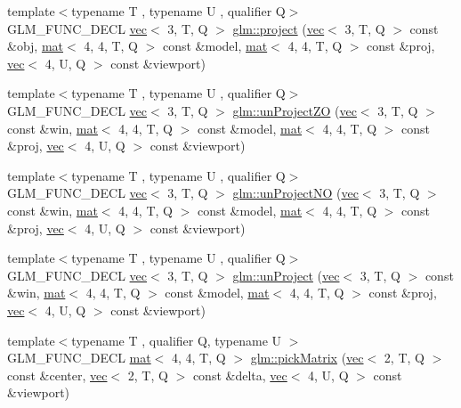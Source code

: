 \begin{DoxyCompactItemize}
\item 
{\footnotesize template$<$typename T , typename U , qualifier Q$>$ }\\G\+L\+M\+\_\+\+F\+U\+N\+C\+\_\+\+D\+E\+CL \hyperlink{structglm_1_1vec}{vec}$<$ 3, T, Q $>$ \hyperlink{group__gtc__matrix__transform_gaf36e96033f456659e6705472a06b6e11}{glm\+::project} (\hyperlink{structglm_1_1vec}{vec}$<$ 3, T, Q $>$ const \&obj, \hyperlink{structglm_1_1mat}{mat}$<$ 4, 4, T, Q $>$ const \&model, \hyperlink{structglm_1_1mat}{mat}$<$ 4, 4, T, Q $>$ const \&proj, \hyperlink{structglm_1_1vec}{vec}$<$ 4, U, Q $>$ const \&viewport)
\item 
{\footnotesize template$<$typename T , typename U , qualifier Q$>$ }\\G\+L\+M\+\_\+\+F\+U\+N\+C\+\_\+\+D\+E\+CL \hyperlink{structglm_1_1vec}{vec}$<$ 3, T, Q $>$ \hyperlink{group__gtc__matrix__transform_gade5136413ce530f8e606124d570fba32}{glm\+::un\+Project\+ZO} (\hyperlink{structglm_1_1vec}{vec}$<$ 3, T, Q $>$ const \&win, \hyperlink{structglm_1_1mat}{mat}$<$ 4, 4, T, Q $>$ const \&model, \hyperlink{structglm_1_1mat}{mat}$<$ 4, 4, T, Q $>$ const \&proj, \hyperlink{structglm_1_1vec}{vec}$<$ 4, U, Q $>$ const \&viewport)
\item 
{\footnotesize template$<$typename T , typename U , qualifier Q$>$ }\\G\+L\+M\+\_\+\+F\+U\+N\+C\+\_\+\+D\+E\+CL \hyperlink{structglm_1_1vec}{vec}$<$ 3, T, Q $>$ \hyperlink{group__gtc__matrix__transform_gae089ba9fc150ff69c252a20e508857b5}{glm\+::un\+Project\+NO} (\hyperlink{structglm_1_1vec}{vec}$<$ 3, T, Q $>$ const \&win, \hyperlink{structglm_1_1mat}{mat}$<$ 4, 4, T, Q $>$ const \&model, \hyperlink{structglm_1_1mat}{mat}$<$ 4, 4, T, Q $>$ const \&proj, \hyperlink{structglm_1_1vec}{vec}$<$ 4, U, Q $>$ const \&viewport)
\item 
{\footnotesize template$<$typename T , typename U , qualifier Q$>$ }\\G\+L\+M\+\_\+\+F\+U\+N\+C\+\_\+\+D\+E\+CL \hyperlink{structglm_1_1vec}{vec}$<$ 3, T, Q $>$ \hyperlink{group__gtc__matrix__transform_ga36641e5d60f994e01c3d8f56b10263d2}{glm\+::un\+Project} (\hyperlink{structglm_1_1vec}{vec}$<$ 3, T, Q $>$ const \&win, \hyperlink{structglm_1_1mat}{mat}$<$ 4, 4, T, Q $>$ const \&model, \hyperlink{structglm_1_1mat}{mat}$<$ 4, 4, T, Q $>$ const \&proj, \hyperlink{structglm_1_1vec}{vec}$<$ 4, U, Q $>$ const \&viewport)
\item 
{\footnotesize template$<$typename T , qualifier Q, typename U $>$ }\\G\+L\+M\+\_\+\+F\+U\+N\+C\+\_\+\+D\+E\+CL \hyperlink{structglm_1_1mat}{mat}$<$ 4, 4, T, Q $>$ \hyperlink{group__gtc__matrix__transform_gaf6b21eadb7ac2ecbbe258a9a233b4c82}{glm\+::pick\+Matrix} (\hyperlink{structglm_1_1vec}{vec}$<$ 2, T, Q $>$ const \&center, \hyperlink{structglm_1_1vec}{vec}$<$ 2, T, Q $>$ const \&delta, \hyperlink{structglm_1_1vec}{vec}$<$ 4, U, Q $>$ const \&viewport)

\end{DoxyCompactItemize}
